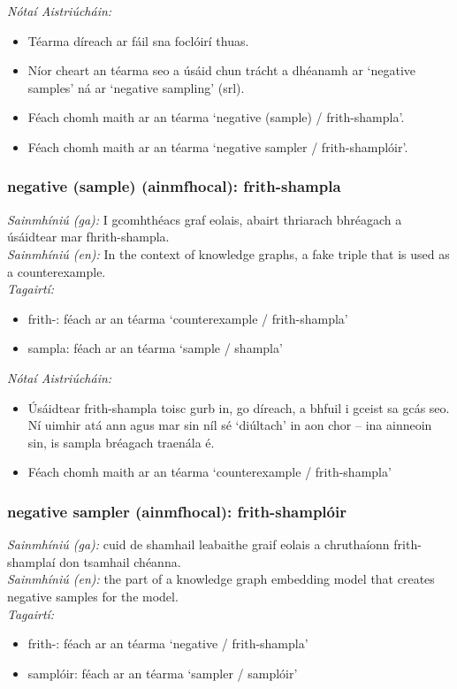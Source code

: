  \noindent \textit{Nótaí Aistriúcháin:}
\begin{itemize}
	\item Téarma díreach ar fáil sna foclóirí thuas.
	\item Níor cheart an téarma seo a úsáid chun trácht a dhéanamh ar `negative samples' ná ar `negative sampling' (srl).
	\item Féach chomh maith ar an téarma `negative (sample) / frith-shampla'.
	\item Féach chomh maith ar an téarma `negative sampler / frith-shamplóir'.
\end{itemize}


\subsubsection*{negative (sample) (ainmfhocal): frith-shampla}
 \noindent \textit{Sainmhíniú (ga):} I gcomhthéacs graf eolais, abairt thriarach bhréagach a úsáidtear mar fhrith-shampla.
\\
 \noindent \textit{Sainmhíniú (en):} In the context of knowledge graphs, a fake triple that is used as a counterexample.
\\
 \noindent \textit{Tagairtí:}
\begin{itemize}
	\item frith-: féach ar an téarma `counterexample / frith-shampla'
	\item sampla: féach ar an téarma `sample / shampla'
\end{itemize}

 \noindent \textit{Nótaí Aistriúcháin:}
\begin{itemize}
	\item Úsáidtear frith-shampla toisc gurb in, go díreach, a bhfuil i gceist sa gcás seo. Ní uimhir atá ann agus mar sin níl sé `diúltach' in aon chor -- ina ainneoin sin, is sampla bréagach traenála é.
	\item Féach chomh maith ar an téarma `counterexample / frith-shampla'
\end{itemize}


\subsubsection*{negative sampler (ainmfhocal): frith-shamplóir}
 \noindent \textit{Sainmhíniú (ga):} cuid de shamhail leabaithe graif eolais a chruthaíonn frith-shamplaí don tsamhail chéanna.
\\
 \noindent \textit{Sainmhíniú (en):} the part of a knowledge graph embedding model that creates negative samples for the model.
\\
 \noindent \textit{Tagairtí:}
\begin{itemize}
	\item frith-: féach ar an téarma `negative / frith-shampla'
	\item samplóir: féach ar an téarma `sampler / samplóir'
\end{itemize}

